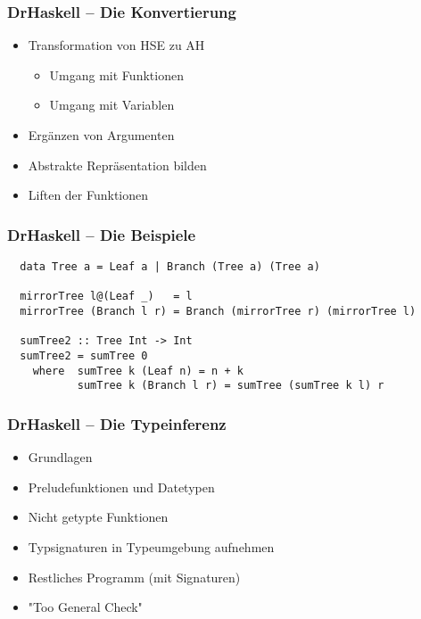 \begin{frame}
	\frametitle{DrHaskell -- Die Konvertierung}
	\begin{itemize}
		\item Transformation von HSE zu AH
		  \begin{itemize}
		    \item Umgang mit Funktionen
		    \item Umgang mit Variablen
		  \end{itemize}
		\item Ergänzen von Argumenten
		\item Abstrakte Repräsentation bilden
		\item Liften der Funktionen
	\end{itemize}
\end{frame}

\begin{frame}[fragile]
\frametitle{DrHaskell -- Die Beispiele}
  \begin{lstlisting}
  data Tree a = Leaf a | Branch (Tree a) (Tree a)

  mirrorTree l@(Leaf _)   = l
  mirrorTree (Branch l r) = Branch (mirrorTree r) (mirrorTree l)
  
  sumTree2 :: Tree Int -> Int
  sumTree2 = sumTree 0
    where  sumTree k (Leaf n) = n + k
           sumTree k (Branch l r) = sumTree (sumTree k l) r 

  \end{lstlisting}
\end{frame}

\begin{frame}
  \frametitle{DrHaskell -- Die Typeinferenz}
  \begin{itemize}
    \item Grundlagen
    \item Preludefunktionen und Datetypen
    \item Nicht getypte Funktionen
    \item Typsignaturen in Typeumgebung aufnehmen
    \item Restliches Programm (mit Signaturen)
    \item "Too General Check"
  \end{itemize}
\end{frame}
